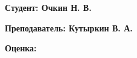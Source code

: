 \documentclass[a4paper, 12pt]{extarticle}
\begin{document}
\section*{}
\vspace{-1\baselineskip}
\section*{}

\vspace{1\baselineskip}

\section*{}

\vspace{1\baselineskip}

\begin{flushright}
    { \normalsize \textbf{Студент: Очкин Н. В. }}
\end{flushright}

\vspace{1\baselineskip}

\begin{flushright}
    { \normalsize \textbf{Преподаватель: Кутыркин В. А.}}
\end{flushright}

\vspace{1\baselineskip}

\begin{flushright}
    { \normalsize \textbf{Оценка: } \hspace{2.5cm} }
\end{flushright}

\vspace{2\baselineskip}

\section*{}

\newpage


\pagestyle{plain}
\setcounter{page}{1}

\section*{}
\end{document}
